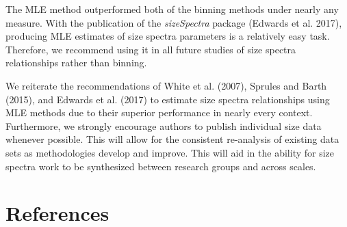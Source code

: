 \documentclass[
]{article}
\begin{document}
The MLE method outperformed both of the binning methods under nearly any
measure. With the publication of the \emph{sizeSpectra} package (Edwards
et al. 2017), producing MLE estimates of size spectra parameters is a
relatively easy task. Therefore, we recommend using it in all future
studies of size spectra relationships rather than binning.

We reiterate the recommendations of White et al. (2007), Sprules and
Barth (2015), and Edwards et al. (2017) to estimate size spectra
relationships using MLE methods due to their superior performance in
nearly every context. Furthermore, we strongly encourage authors to
publish individual size data whenever possible. This will allow for the
consistent re-analysis of existing data sets as methodologies develop
and improve. This will aid in the ability for size spectra work to be
synthesized between research groups and across scales.

\newpage

\hypertarget{references}{%
\section{References}\label{references}}
\end{document}
